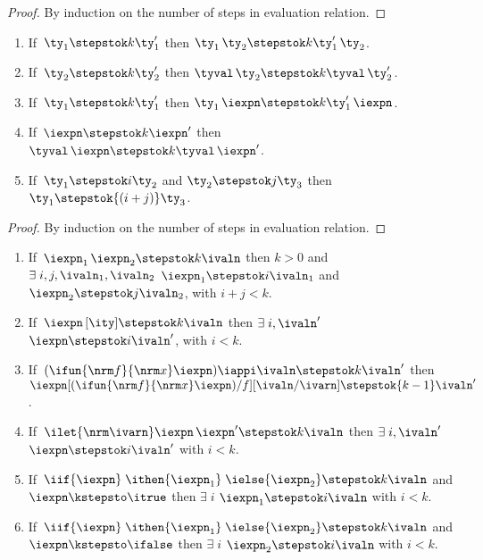 \begin{proof}
  By induction on the number of steps in evaluation relation.
\end{proof}

\begin{lemma}
  \begin{enumerate}
  \item If $\,\ty_1 \stepstok k \ty_1'$ then $\ty_1 \, \ty_2
    \stepstok k \ty_1' \, \ty_2$.
  \item If $\,\ty_2 \stepstok k \ty_2'$ then $\tyval \, \ty_2
    \stepstok k \tyval \, \ty_2'$.
  \item If $\,\ty_1 \stepstok k \ty_1'$ then $\ty_1 \, \iexpn
    \stepstok k \ty_1' \, \iexpn$.
  \item If $\,\iexpn \stepstok k \iexpn'$ then $\tyval \, \iexpn
    \stepstok k \tyval \, \iexpn'$.
  \item If $\,\ty_1 \stepstok i \ty_2$ and $\ty_2 \stepstok j \ty_3$
    then $\ty_1 \stepstok {(i+j)} \ty_3$.
  \end{enumerate}
\label{lemma:kleene-norm}
\end{lemma}

\begin{proof}
  By induction on the number of steps in evaluation relation.
\end{proof}

\begin{lemma}
  \begin{enumerate}
  \item If $\, \iexpn_1 \, \iexpn_2 \stepstok k \ivaln$ then $k > 0$ and
    $\exists\;i,j,\ivaln_1,\ivaln_2$ \suchthat{} $\iexpn_1 \stepstok i \ivaln_1$ and $\iexpn_2 \stepstok j
      \ivaln_2$, with $i+j < k$.
  \item If $\, \iexpn\,[\ity] \stepstok k \ivaln$ then
    $\exists\;i,\ivaln'$ \suchthat{} $\iexpn \stepstok i
    \ivaln'$, with $i < k$.
  \item If $\, (\ifun {\nrm f} {\nrm x} \iexpn) \iappi \ivaln \stepstok k \ivaln'$ then
    $\iexpn[(\ifun {\nrm f} {\nrm x} \iexpn)/f][\ivaln/\ivarn] \stepstok {k-1} \ivaln'$.
  \item If $\, \ilet {\nrm \ivarn} \iexpn \, \iexpn' \stepstok k
    \ivaln$ then $\exists\;i,\ivaln'$ \suchthat{} $\iexpn
    \stepstok i \ivaln'$ with $i < k$. 
  \item If $\, \iif{\iexpn}\;\ithen {\iexpn_1}\; \ielse{\iexpn_2} \stepstok
    k \ivaln$ and $\iexpn \kstepsto \itrue$ then $\exists\;i$ \suchthat{} $\iexpn_1 \stepstok i
    \ivaln$ with $i < k$.
  \item If $\, \iif{\iexpn}\;\ithen {\iexpn_1}\; \ielse{\iexpn_2} \stepstok
    k \ivaln$ and $\iexpn \kstepsto \ifalse$ then $\exists\;i$ \suchthat{} $\iexpn_2 \stepstok i
    \ivaln$ with $i < k$.
  \end{enumerate}
\label{lemma:kleene-eval-inv}
\end{lemma}


